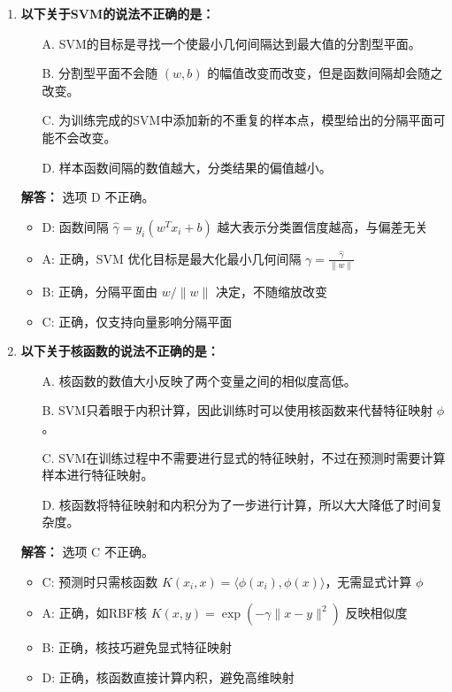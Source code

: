 \documentclass[a4paper,12pt]{book}
\begin{document}
\begin{enumerate}[label=\arabic*.]
    \item \textbf{以下关于SVM的说法不正确的是：}
    \begin{itemize}
        \item[A.] SVM的目标是寻找一个使最小几何间隔达到最大值的分割型平面。
        \item[B.] 分割型平面不会随 \((w, b)\) 的幅值改变而改变，但是函数间隔却会随之改变。
        \item[C.] 为训练完成的SVM中添加新的不重复的样本点，模型给出的分隔平面可能不会改变。
        \item[D.] 样本函数间隔的数值越大，分类结果的偏值越小。
    \end{itemize}
    
    \textbf{解答：} 选项 D 不正确。\\
    \begin{itemize}
        \item D: 函数间隔 $\hat{\gamma} = y_i(w^Tx_i + b)$ 越大表示分类置信度越高，与偏差无关
        \item A: 正确，SVM 优化目标是最大化最小几何间隔 $\gamma = \frac{\hat{\gamma}}{\|w\|}$
        \item B: 正确，分隔平面由 $w/\|w\|$ 决定，不随缩放改变
        \item C: 正确，仅支持向量影响分隔平面
    \end{itemize}
    
    \item \textbf{以下关于核函数的说法不正确的是：}
    \begin{itemize}
        \item[A.] 核函数的数值大小反映了两个变量之间的相似度高低。
        \item[B.] SVM只着眼于内积计算，因此训练时可以使用核函数来代替特征映射 \(\phi\)。
        \item[C.] SVM在训练过程中不需要进行显式的特征映射，不过在预测时需要计算样本进行特征映射。
        \item[D.] 核函数将特征映射和内积分为了一步进行计算，所以大大降低了时间复杂度。
    \end{itemize}
    
    \textbf{解答：} 选项 C 不正确。\\
    \begin{itemize}
        \item C: 预测时只需核函数 $K(x_i,x) = \langle \phi(x_i), \phi(x) \rangle$，无需显式计算 $\phi$
        \item A: 正确，如RBF核 $K(x,y) = \exp(-\gamma\|x-y\|^2)$ 反映相似度
        \item B: 正确，核技巧避免显式特征映射
        \item D: 正确，核函数直接计算内积，避免高维映射
    \end{itemize}
    

\end{enumerate}
\end{document}
